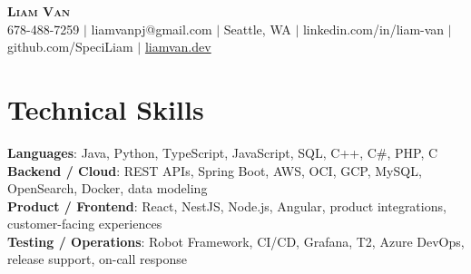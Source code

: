 \documentclass[letterpaper,11pt]{article}
\begin{document}

%
\begin{center}
    \textbf{\Huge \scshape Liam Van} \\ \vspace{1pt}
    \small 678-488-7259 $|$ \small {liamvanpj@gmail.com} $|$ Seattle, WA
 {{$|$ linkedin.com/in/liam-van} {$|$ github.com/SpeciLiam} {$|$ \href{https://liamvan.dev}{liamvan.dev}}}

\end{center}

\section{Technical Skills}
 \begin{itemize}[leftmargin=0.15in, label={}]
    \small{\item{
     \textbf{Languages}{: Java, Python, TypeScript, JavaScript, SQL, C++, C\#, PHP, C} \\
     \textbf{Backend / Cloud}{: REST APIs, Spring Boot, AWS, OCI, GCP, MySQL, OpenSearch, Docker, data modeling} \\
     \textbf{Product / Frontend}{: React, NestJS, Node.js, Angular, product integrations, customer-facing experiences} \\
     \textbf{Testing / Operations}{: Robot Framework, CI/CD, Grafana, T2, Azure DevOps, release support, on-call response} \\
    }}
 \end{itemize}
%

\end{document}
